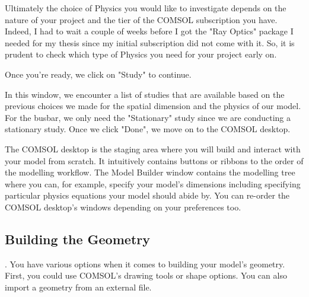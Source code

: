 Ultimately the choice of Physics you would like to investigate depends on the nature of your project and the tier of the COMSOL subscription you have. Indeed, I had to wait a couple of weeks before I got the "Ray Optics" package I needed for my thesis since my initial subscription did not come with it. So, it is prudent to check which type of Physics you need for your project early on.

Once you're ready, we click on "Study" to continue.


In this window, we encounter a list of studies that are available based on the previous choices we made for the spatial dimension and the physics of our model. For the busbar, we only need the "Stationary" study since we are conducting a stationary study. Once we click "Done", we move on to the COMSOL desktop.


The COMSOL desktop is the staging area where you will build and interact with your model from scratch. It intuitively contains buttons or ribbons to the order of the modelling workflow. The Model Builder window contains the modelling tree where you can, for example, specify your model's dimensions including specifying particular physics equations your model should abide by. You can re-order the COMSOL desktop's windows depending on your preferences too.

\subsection{Building the Geometry}.
You have various options when it comes to building your model's geometry. First, you could use COMSOL's drawing tools or shape options. You can also import a geometry from an external file.


